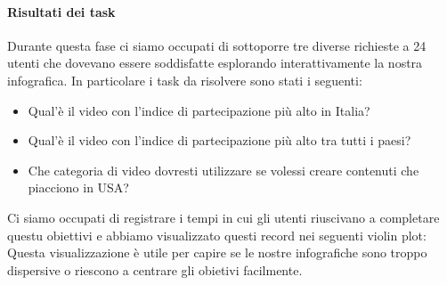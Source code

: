 \documentclass[10pt, a4paper,openany]{article}
\begin{document}
\begin{multicols}{2}
\paragraph{Risultati dei task} Durante questa fase ci siamo occupati di sottoporre tre diverse richieste a 24 utenti che dovevano essere soddisfatte esplorando interattivamente la nostra infografica. In particolare i task da risolvere sono stati i seguenti:
\begin{itemize}
	\item Qual'è il video con l'indice di partecipazione più alto in Italia?
	\item Qual'è il video con l'indice di partecipazione più alto tra tutti i paesi?
	\item Che categoria di video dovresti utilizzare se volessi creare contenuti che piacciono in USA?
\end{itemize}Ci siamo occupati di registrare i tempi in cui gli utenti riuscivano a completare questu obiettivi e abbiamo visualizzato questi record nei seguenti violin plot:
Questa visualizzazione è utile per capire se le nostre infografiche sono troppo dispersive o riescono a centrare gli obietivi facilmente.

\end{multicols}
\end{document}
